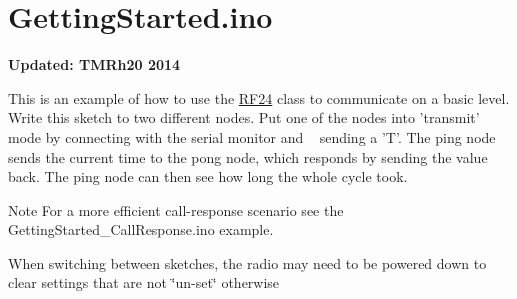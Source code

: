 \hypertarget{_getting_started_8ino-example}{\section{Getting\+Started.\+ino}
}
{\bfseries Updated\+: T\+M\+Rh20 2014 }~\newline


This is an example of how to use the \hyperlink{class_r_f24}{R\+F24} class to communicate on a basic level. Write this sketch to two different nodes. Put one of the nodes into 'transmit' mode by connecting with the serial monitor and ~\newline
 sending a 'T'. The ping node sends the current time to the pong node, which responds by sending the value back. The ping node can then see how long the whole cycle took. ~\newline
 \begin{DoxyNote}{Note}
For a more efficient call-\/response scenario see the Getting\+Started\+\_\+\+Call\+Response.\+ino example. 

When switching between sketches, the radio may need to be powered down to clear settings that are not \char`\"{}un-\/set\char`\"{} otherwise
\end{DoxyNote}

\begin{DoxyCodeInclude}
\end{DoxyCodeInclude}
 